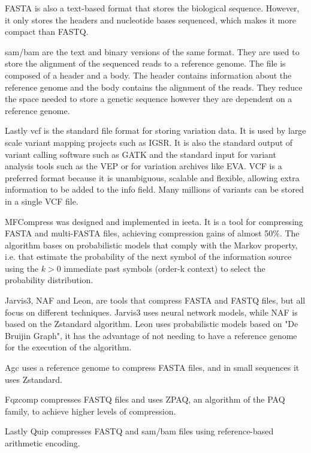 FASTA is also a text-based format that stores the biological sequence. However, it only stores the headers and nucleotide bases sequenced, which makes it more compact than FASTQ.

\ac{sam}/\ac{bam} are the text and binary versions of the same format. They are used to store the alignment of the sequenced reads to a reference genome. The file is composed of a header and a body. The header contains information about the reference genome and the body contains the alignment of the reads. They reduce the space needed to store a genetic sequence however they are dependent on a reference genome.

Lastly \ac{vcf} is the standard file format for storing variation data. It is used by large scale variant mapping projects such as IGSR. It is also the standard output of variant calling software such as GATK and the standard input for variant analysis tools such as the VEP or for variation archives like EVA.
VCF is a preferred format because it is unambiguous, scalable and flexible, allowing extra information to be added to the info field. Many millions of variants can be stored in a single VCF file. 

MFCompress was designed and implemented in \ac{ieeta}. It is a tool for compressing FASTA and multi-FASTA files, achieving compression gains of almost 50\%. The algorithm bases on probabilistic models that comply with the Markov property, i.e. that estimate the probability of the next symbol of the information source using the $k>0$ immediate past symbols (order-k context) to select the probability distribution. 

Jarvis3, NAF and Leon, are tools that compress FASTA and FASTQ files, but all focus on different techniques. Jarvis3 uses neural network models, while NAF is based on the Zstandard algorithm. Leon uses probabilistic models based on "De Bruijin Graph", it has the advantage of not needing to have a reference genome for the execution of the algorithm.

Agc uses a reference genome to compress FASTA files, and in small sequences it uses Zstandard.

Fqzcomp compresses FASTQ files and uses ZPAQ, an algorithm of the PAQ family, to achieve higher levels of compression.

Lastly Quip compresses FASTQ and \ac{sam}/\ac{bam} files using reference-based arithmetic encoding.









